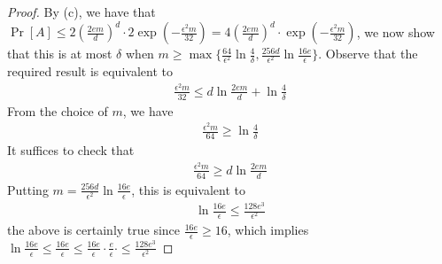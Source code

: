 \begin{proof}
    By (c), we have that $\Pr[A]\le 2(\frac{2em}{d})^d\cdot 2\exp( -\frac{\epsilon^2m}{32})=4(\frac{2em}{d})^d\cdot\exp( -\frac{\epsilon^2m}{32})$,
    we now show that this is at most $\delta$ when $m\ge\max\{\frac{64}{\epsilon^2}\ln\frac{4}{\delta}, \frac{256d}{\epsilon^2}\ln\frac{16e}{\epsilon}\}$.
    Observe that the required result is equivalent to 
    \begin{align}
       \nonumber  \frac{\epsilon^2m}{32} \le d\ln \frac{2em}{d} + \ln \frac{4}{\delta}
    \end{align}
    From the choice of $m$, we have
    \begin{align}
        \nonumber \frac{\epsilon^2m}{64}\ge \ln\frac{4}{\delta}
    \end{align}
    It suffices to check that 
    \begin{align}
        \nonumber \frac{\epsilon^2m}{64}\ge d\ln \frac{2em}{d}
    \end{align}
    Putting $m= \frac{256d}{\epsilon^2}\ln\frac{16e}{\epsilon}$, this is equivalent to 
    \begin{align}
        \nonumber \ln \frac{16e}{\epsilon} \le \frac{128e^3}{\epsilon^2}
    \end{align}
    the above is certainly true since $\frac{16e}{\epsilon}\ge 16$, which implies $\ln \frac{16e}{\epsilon} \le \frac{16e}{\epsilon} \le\frac{16e}{\epsilon}\cdot \frac{e}{\epsilon} \cdot \le \frac{128e^3}{\epsilon^2} $
\end{proof}
